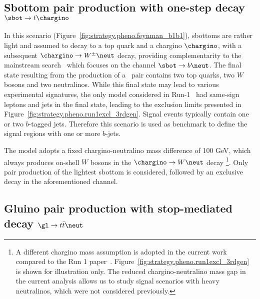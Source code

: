 \subsection*{Sbottom pair production with one-step decay $\sbot\to t\chargino$}
\label{subsec:signals_sbot}

In this scenario (Figure~\ref{fig:strategy.pheno.feynman_b1b1}), sbottoms are rather light and assumed to decay to a top quark and a chargino $\chargino$, 
with a subsequent $\chargino\to W^\pm\neut$ decay, 
providing complementarity to the mainstream search~\cite{ATLAS-CONF-2015-066} which focuses on the channel $\sbot\to b\neut$. 
The final state resulting from the production of a \sbsb\ pair contains two top quarks, two $W$ bosons and two neutralinos. 
While this final state may lead to various experimental signatures, 
the only model considered in Run-1~\cite{SUSY-2014-06} had
same-sign leptons and jets in the final state, leading to the exclusion limits presented in Figure~\ref{fig:strategy.pheno.run1excl_3rdgen}. 
Signal events typically contain one or two $b$-tagged jets. 
Therefore this scenario is used as benchmark to define the signal regions with one or more $b$-jets. 

The model adopts a fixed chargino-neutralino mass difference of 100 GeV, 
which always produces on-shell $W$ bosons in the $\chargino\to W\neut$ decay
\footnote{A different chargino mass assumption is adopted in the current 
work compared to the Run 1 paper~\cite{SUSY-2014-06}.
Figure~\ref{fig:strategy.pheno.run1excl_3rdgen} is shown for illustration only.
The reduced chargino-neutralino mass gap in the current analysis 
allows us to study signal scenarios with heavy neutralinos, which were not considered previously.}.
Only pair production of the lightest sbottom is considered, followed by an exclusive decay in the aforementioned channel. 


\subsection*{Gluino pair production with stop-mediated decay $\gl\to t\bar t\neut$}
\label{subsec:signals_gtt}

